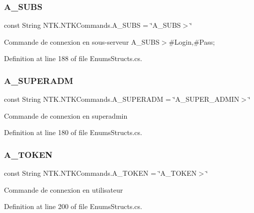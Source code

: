\subsubsection{\texorpdfstring{A\_SUBS}{A\_SUBS}}
{\footnotesize\ttfamily const String N\+T\+K.\+N\+T\+K\+Commands.\+A\+\_\+\+S\+U\+BS = \char`\"{}A\+\_\+\+S\+U\+BS$>$\char`\"{}}



Commande de connexion en sous-\/serveur A\+\_\+\+S\+U\+BS$>$\#\+Login,\#\+Pass; 



Definition at line 188 of file Enums\+Structs.\+cs.

\mbox{\label{struct_n_t_k_1_1_n_t_k_commands_ab4657fd309d8b7232abf9e121461b936}} 
\subsubsection{\texorpdfstring{A\_SUPERADM}{A\_SUPERADM}}
{\footnotesize\ttfamily const String N\+T\+K.\+N\+T\+K\+Commands.\+A\+\_\+\+S\+U\+P\+E\+R\+A\+DM = \char`\"{}A\+\_\+\+S\+U\+P\+E\+R\+\_\+\+A\+D\+M\+IN$>$\char`\"{}}



Commande de connexion en superadmin 



Definition at line 180 of file Enums\+Structs.\+cs.

\mbox{\label{struct_n_t_k_1_1_n_t_k_commands_a8c9c1f2e3c358209630dabc5a889bbe1}} 
\subsubsection{\texorpdfstring{A\_TOKEN}{A\_TOKEN}}
{\footnotesize\ttfamily const String N\+T\+K.\+N\+T\+K\+Commands.\+A\+\_\+\+T\+O\+K\+EN = \char`\"{}A\+\_\+\+T\+O\+K\+EN$>$\char`\"{}}



Commande de connexion en utilisateur 



Definition at line 200 of file Enums\+Structs.\+cs.

\mbox{\label{struct_n_t_k_1_1_n_t_k_commands_a6a108249ba9440928ec8f6fdcaeed15e}} 
